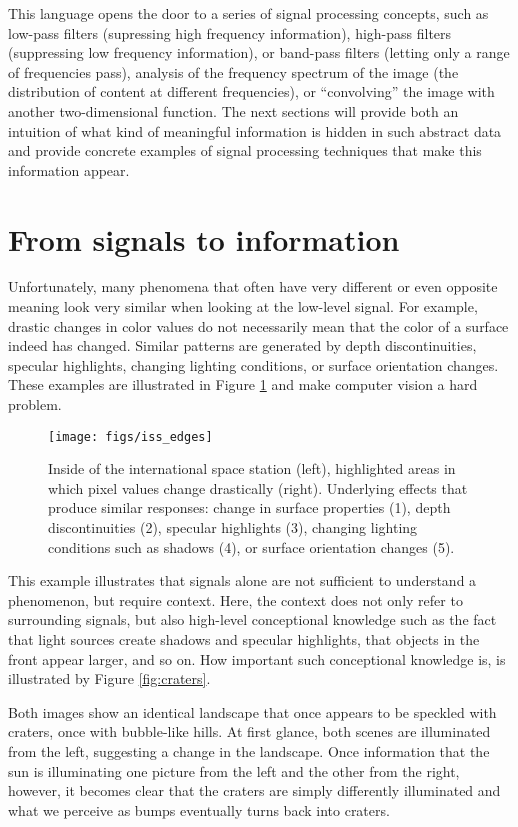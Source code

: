 This language opens the door to a series of signal processing concepts, such as low-pass filters (supressing high frequency information), high-pass filters (suppressing low frequency information), or band-pass filters (letting only a range of frequencies pass), analysis of the frequency spectrum of the image (the distribution of content at different frequencies), or ``convolving'' the image with another two-dimensional function. The next sections will provide both an intuition of what kind of meaningful information is hidden in such abstract data and provide concrete examples of signal processing techniques that make this information appear.

\section{From signals to information}
Unfortunately, many phenomena that often have very different or even opposite meaning look very similar when looking at the low-level signal. For example, drastic changes in color values do not necessarily mean that the color of a surface indeed has changed. Similar patterns are generated by depth discontinuities, specular highlights, changing lighting conditions, or surface orientation changes. These examples are illustrated in Figure \ref{fig:iss_edges} and make computer vision a hard problem.  

\begin{figure}[!htb]
	\centering
		\texttt{[image: figs/iss\_edges]}
	\caption{Inside of the international space station (left), highlighted areas in which pixel values change drastically (right). Underlying effects that produce similar responses: change in surface properties (1), depth discontinuities (2), specular highlights (3), changing lighting conditions such as shadows (4), or surface orientation changes (5).
	\label{fig:iss_edges}}
\end{figure}

This example illustrates that signals alone are not sufficient to understand a phenomenon, but require context. Here, the context does not only refer to surrounding signals, but also high-level conceptional knowledge such as the fact that light sources create shadows and specular highlights, that objects in the front appear larger, and so on. How important such conceptional knowledge is, is illustrated by Figure \ref{fig:craters}.

Both images show an identical landscape that once appears to be speckled with craters, once with bubble-like hills. At first glance, both scenes are illuminated from the left, suggesting a change in the landscape. Once information that the sun is illuminating one picture from the left and the other from the right, however, it becomes clear that the craters are simply differently illuminated and what we perceive as bumps eventually turns back into craters. 

